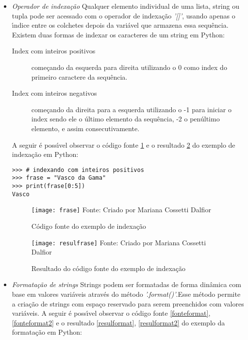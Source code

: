 \begin{itemize}
\item \textit{Operador de indexa\c{c}\~{a}o}\newline
Qualquer elemento individual de uma lista, string ou tupla pode ser acessado com o operador de indexa\c{c}\~{a}o \textsl{'[]'}, usando apenas o \'{\i}ndice entre os colchetes depois da vari\'{a}vel que armazena essa sequ\^{e}ncia. Existem duas formas de indexar os caracteres de um string em Python: \newline
\begin{description}
	  \item[Index com inteiros positivos] come\c{c}ando da esquerda para direita utilizando o 0 como index do primeiro caractere da sequ\^{e}ncia.
	  \item[Index com inteiros negativos] come\c{c}ando da direita para a esquerda utilizando o -1 para iniciar o index sendo ele o \'{u}ltimo elemento da sequ\^{e}ncia, -2 o pen\'{u}ltimo elemento, e assim consecutivamente.
\end{description}

A seguir \'{e} poss\'{\i}vel observar o c\'{o}digo fonte \ref{fontefrase} e o resultado \ref{resulfrase} do exemplo de indexa\c{c}\~{a}o em Python:

\begin{lstlisting}
>>> # indexando com inteiros positivos
>>> frase = "Vasco da Gama"
>>> print(frase[0:5])
Vasco
\end{lstlisting}

\begin{figure}[H]
	\begin{center}
		\caption{C\'{o}digo fonte do exemplo de indexa\c{c}\~{a}o} \label{fontefrase}
		\texttt{[image: frase]} 
		\newline
		Fonte: Criado por Mariana Cossetti Dalfior
	\end{center}
\end{figure}

\begin{figure}[H]
	\begin{center}
		\caption{Resultado do c\'{o}digo fonte do exemplo de indexa\c{c}\~{a}o} \label{resulfrase}
		\texttt{[image: resulfrase]} 
		\newline
		Fonte: Criado por Mariana Cossetti Dalfior
	\end{center}
\end{figure}

\item \textit{Formata\c{c}\~{a}o de strings}\newline
Strings podem ser formatadas de forma din\^{a}mica com base em valores vari\'{a}veis atrav\'{e}s do m\'{e}todo \textsl{'.format()'}.Esse m\'{e}todo permite a cria\c{c}\~{a}o de strings com espa\c{c}o reservado para serem preenchidos com valores vari\'{a}veis. A seguir \'{e} poss\'{\i}vel observar o c\'{o}digo fonte \ref{fonteformat}, \ref{fonteformat2} e o resultado \ref{resulformat}, \ref{resulformat2} do exemplo da formata\c{c}\~{a}o em Python:
		

\end{itemize}
